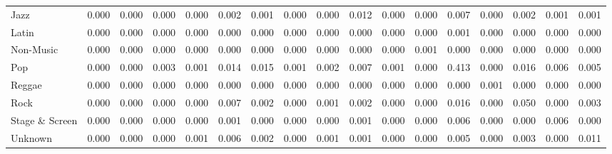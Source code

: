 \begin{table}
\begin{tabular}{lrrrrrrrrrrrrrrrr}
                  Jazz &  0.000 &             0.000 &       0.000 &      0.000 &       0.002 &                   0.001 &        0.000 &    0.000 & 0.012 &  0.000 &      0.000 & 0.007 &   0.000 & 0.002 &           0.001 &    0.001 \\
                 Latin &  0.000 &             0.000 &       0.000 &      0.000 &       0.000 &                   0.000 &        0.000 &    0.000 & 0.000 &  0.000 &      0.000 & 0.001 &   0.000 & 0.000 &           0.000 &    0.000 \\
             Non-Music &  0.000 &             0.000 &       0.000 &      0.000 &       0.000 &                   0.000 &        0.000 &    0.000 & 0.000 &  0.000 &      0.001 & 0.000 &   0.000 & 0.000 &           0.000 &    0.000 \\
                   Pop &  0.000 &             0.000 &       0.003 &      0.001 &       0.014 &                   0.015 &        0.001 &    0.002 & 0.007 &  0.001 &      0.000 & 0.413 &   0.000 & 0.016 &           0.006 &    0.005 \\
                Reggae &  0.000 &             0.000 &       0.000 &      0.000 &       0.000 &                   0.000 &        0.000 &    0.000 & 0.000 &  0.000 &      0.000 & 0.000 &   0.001 & 0.000 &           0.000 &    0.000 \\
                  Rock &  0.000 &             0.000 &       0.000 &      0.000 &       0.007 &                   0.002 &        0.000 &    0.001 & 0.002 &  0.000 &      0.000 & 0.016 &   0.000 & 0.050 &           0.000 &    0.003 \\
        Stage \& Screen &  0.000 &             0.000 &       0.000 &      0.000 &       0.001 &                   0.000 &        0.000 &    0.000 & 0.001 &  0.000 &      0.000 & 0.006 &   0.000 & 0.000 &           0.006 &    0.000 \\
               Unknown &  0.000 &             0.000 &       0.000 &      0.001 &       0.006 &                   0.002 &        0.000 &    0.001 & 0.001 &  0.000 &      0.000 & 0.005 &   0.000 & 0.003 &           0.000 &    0.011 \\
\bottomrule
\end{tabular}
\end{table}
